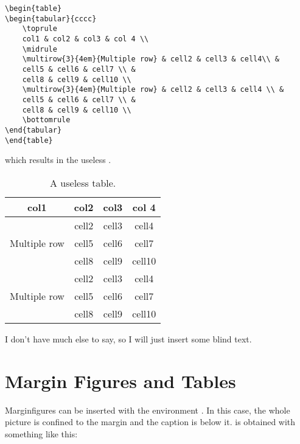\begin{lstlisting}[caption={Caption of a listing.}]
\begin{table}
\begin{tabular}{cccc}
    \toprule
    col1 & col2 & col3 & col 4 \\
    \midrule
    \multirow{3}{4em}{Multiple row} & cell2 & cell3 & cell4\\ &
    cell5 & cell6 & cell7 \\ &
    cell8 & cell9 & cell10 \\
    \multirow{3}{4em}{Multiple row} & cell2 & cell3 & cell4 \\ &
    cell5 & cell6 & cell7 \\ &
    cell8 & cell9 & cell10 \\
    \bottomrule
\end{tabular}
\end{table}
\end{lstlisting}

which results in the useless .

\begin{table}[ht]
\caption[A useless table]{A useless table.}
\begin{tabular}{cccc}
    \toprule
    col1 & col2 & col3 & col 4 \\
    \midrule
    \multirow{3}{4em}{Multiple row} & cell2 & cell3 & cell4\\ &
    cell5 & cell6 & cell7 \\ &
    cell8 & cell9 & cell10 \\
    \multirow{3}{4em}{Multiple row} & cell2 & cell3 & cell4 \\ &
    cell5 & cell6 & cell7 \\ &
    cell8 & cell9 & cell10 \\
    \bottomrule
\end{tabular}
\end{table}

I don't have much else to say, so I will just insert some blind text. 
\blindtext

\section{Margin Figures and Tables}

Marginfigures can be inserted with the environment 
. In this case, the whole picture is confined 
to the margin and the caption is below it.  is 
obtained with something like this:

